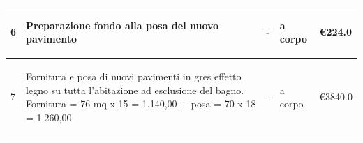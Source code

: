 \documentclass[a4paper]{article}
\begin{document}
\begin{tabular}{ | L{10mm} |  L{86mm} | L{12mm} | L{12mm} | L{16mm} | }
                         \vspace{2.5mm}\begin{spacing}{0}6\end{spacing} &\vspace{2.5mm}\begin{spacing}{0}Preparazione fondo alla posa del nuovo pavimento\end{spacing} &\vspace{2.5mm}\begin{spacing}{0}-\end{spacing} &\vspace{2.5mm}\begin{spacing}{0}a corpo\end{spacing} &\vspace{2.5mm}\begin{spacing}{0}\euro\hfill  224.0
                         \end{spacing} \\ \hline %

                         \vspace{2.5mm}\begin{spacing}{0}7\end{spacing} &\vspace{2.5mm}\begin{spacing}{0}Fornitura e posa di nuovi pavimenti in gres effetto legno su tutta l'abitazione ad esclusione del bagno. Fornitura = 76 mq x 15 = 1.140,00 + posa = 70 x 18 = 1.260,00\end{spacing} &\vspace{2.5mm}\begin{spacing}{0}-\end{spacing} &\vspace{2.5mm}\begin{spacing}{0}a corpo\end{spacing} &\vspace{2.5mm}\begin{spacing}{0}\euro\hfill  3840.0
                         \end{spacing} \\ \hline %


\end{tabular}
\end{document}
